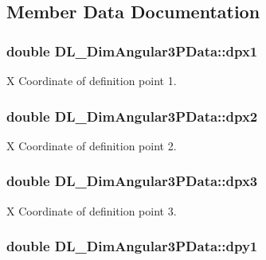 \subsection{Member Data Documentation}
\hypertarget{structDL__DimAngular3PData_adbc06ec7f4f04281abe01a7f133d690a}{
\subsubsection[{dpx1}]{\setlength{\rightskip}{0pt plus 5cm}double D\-L\-\_\-\-Dim\-Angular3\-P\-Data\-::dpx1}}\label{structDL__DimAngular3PData_adbc06ec7f4f04281abe01a7f133d690a}
X Coordinate of definition point 1. \hypertarget{structDL__DimAngular3PData_aa166b2aded5c79b128a4124aaa7a0e92}{
\subsubsection[{dpx2}]{\setlength{\rightskip}{0pt plus 5cm}double D\-L\-\_\-\-Dim\-Angular3\-P\-Data\-::dpx2}}\label{structDL__DimAngular3PData_aa166b2aded5c79b128a4124aaa7a0e92}
X Coordinate of definition point 2. \hypertarget{structDL__DimAngular3PData_a3ef443d5fd3adf79af50e34a9a19a0a4}{
\subsubsection[{dpx3}]{\setlength{\rightskip}{0pt plus 5cm}double D\-L\-\_\-\-Dim\-Angular3\-P\-Data\-::dpx3}}\label{structDL__DimAngular3PData_a3ef443d5fd3adf79af50e34a9a19a0a4}
X Coordinate of definition point 3. \hypertarget{structDL__DimAngular3PData_a5c2773d2f916195d040686ec5a89197c}{
\subsubsection[{dpy1}]{\setlength{\rightskip}{0pt plus 5cm}double D\-L\-\_\-\-Dim\-Angular3\-P\-Data\-::dpy1}}\label{structDL__DimAngular3PData_a5c2773d2f916195d040686ec5a89197c}
